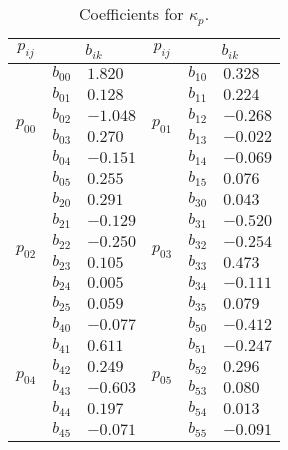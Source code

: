 \begin{table}[tb]
	\centering
	\caption{Coefficients for $\kappa_p$.}
	\label{T:T1}
	\begin{tabular}{@{}cll|cll@{}}
		\hline
		$p_{ij}$                  & \multicolumn{2}{c}{$b_{ik}$} & $p_{ij}$ & \multicolumn{2}{c}{$b_{ik}$}\\
		\hline
		\multirow{6}{*}{$p_{00}$} & $b_{00}$  & $1.820$ &   \multirow{6}{*}{$p_{01}$} & $b_{10}$ & $0.328$ \\ %
		& $b_{01}$      & $0.128$   &  	& $b_{11}$      & $0.224$ \\ %
		& $b_{02}$      & $-1.048$   &	& $b_{12}$      & $-0.268$ \\ %
		& $b_{03}$      & $0.270$   &	& $b_{13}$      & $-0.022$ \\ %
		& $b_{04}$      & $-0.151$  & 	& $b_{14}$      & $-0.069$  \\ %
		& $b_{05}$      & $0.255$   &	& $b_{15}$      & $0.076$    \\ \hline
		\multirow{6}{*}{$p_{02}$} & $b_{20}$  & $0.291$	& \multirow{6}{*}{$p_{03}$} & $b_{30}$ & $0.043$ \\ %
		& $b_{21}$      & $-0.129$   & & $b_{31}$      & $-0.520$  \\ %
		& $b_{22}$      & $-0.250$   & & $b_{32}$      & $-0.254$  \\ %
		& $b_{23}$      & $0.105$    & & $b_{33}$      & $0.473$   \\ %
		& $b_{24}$      & $0.005$  & & $b_{34}$      & $-0.111$  \\ %
		& $b_{25}$      & $0.059$   & & $b_{35}$      & $0.079$  \\ \hline
		\multirow{6}{*}{$p_{04}$} & $b_{40}$      & $-0.077$  & \multirow{6}{*}{$p_{05}$} & $b_{50}$      & $-0.412$   \\ %
		& $b_{41}$      & $0.611$     &  & $b_{51}$      & $-0.247$\\ %
		& $b_{42}$      & $0.249$     &  & $b_{52}$      & $0.296$\\ %
		& $b_{43}$      & $-0.603$    &  & $b_{53}$      & $0.080$\\ %
		& $b_{44}$      & $0.197$     &  & $b_{54}$      & $0.013$\\ %
		& $b_{45}$      & $-0.071$   &  & $b_{55}$      & $-0.091$\\
		\hline
	\end{tabular}
\end{table}
